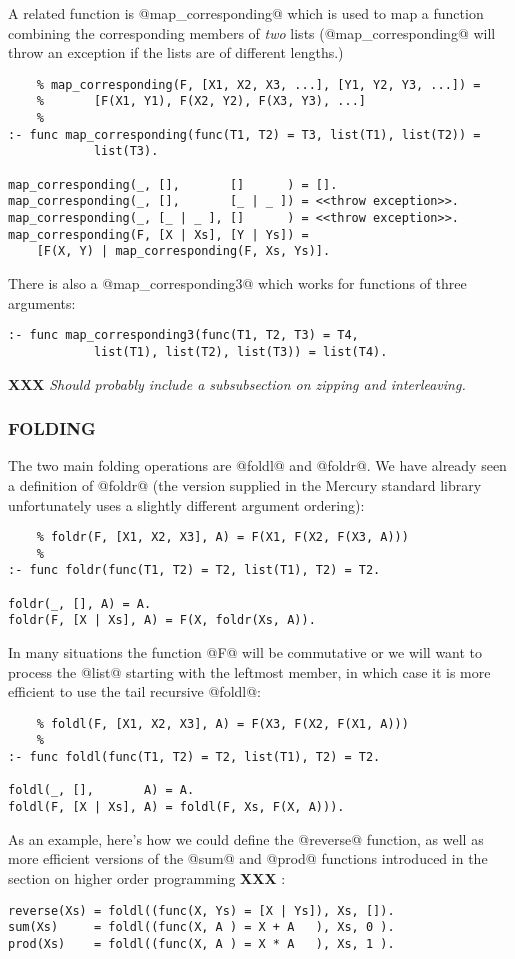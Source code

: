 \documentclass[a4paper,11pt,notitlepage,onecolumn]{article}
\newcommand{\XXX}[1]%
{{\small\textbf{XXX} \emph{#1}}}
\begin{document}
A related function is @map_corresponding@ which is used to map a
function combining the corresponding members of \emph{two} lists
(@map_corresponding@ will throw an exception if the lists are of
different lengths.)
\begin{verbatim}
    % map_corresponding(F, [X1, X2, X3, ...], [Y1, Y2, Y3, ...]) =
    %       [F(X1, Y1), F(X2, Y2), F(X3, Y3), ...]
    %
:- func map_corresponding(func(T1, T2) = T3, list(T1), list(T2)) =
            list(T3).

map_corresponding(_, [],       []      ) = [].
map_corresponding(_, [],       [_ | _ ]) = <<throw exception>>.
map_corresponding(_, [_ | _ ], []      ) = <<throw exception>>.
map_corresponding(F, [X | Xs], [Y | Ys]) =
    [F(X, Y) | map_corresponding(F, Xs, Ys)].
\end{verbatim}

There is also a @map_corresponding3@ which works for functions of three
arguments:
\begin{verbatim}
:- func map_corresponding3(func(T1, T2, T3) = T4,
            list(T1), list(T2), list(T3)) = list(T4).
\end{verbatim}

\XXX{Should probably include a subsubsection on zipping and
interleaving.}

\subsubsection{FOLDING}

The two main folding operations are @foldl@ and @foldr@.  We have
already seen a definition of @foldr@ (the version supplied in the
Mercury standard library unfortunately uses a slightly different
argument ordering):
\begin{verbatim}
    % foldr(F, [X1, X2, X3], A) = F(X1, F(X2, F(X3, A)))
    %
:- func foldr(func(T1, T2) = T2, list(T1), T2) = T2.

foldr(_, [], A) = A.
foldr(F, [X | Xs], A) = F(X, foldr(Xs, A)).
\end{verbatim}
In many situations the function @F@ will be commutative or we will want
to process the @list@ starting with the leftmost member, in which case
it is more efficient to use the tail recursive @foldl@:
\begin{verbatim}
    % foldl(F, [X1, X2, X3], A) = F(X3, F(X2, F(X1, A)))
    %
:- func foldl(func(T1, T2) = T2, list(T1), T2) = T2.

foldl(_, [],       A) = A.
foldl(F, [X | Xs], A) = foldl(F, Xs, F(X, A))).
\end{verbatim}
As an example, here's how we could define the @reverse@ function, as
well as more efficient versions of the @sum@ and @prod@ functions
introduced in the section on higher order programming \XXX{}:
\begin{verbatim}
reverse(Xs) = foldl((func(X, Ys) = [X | Ys]), Xs, []).
sum(Xs)     = foldl((func(X, A ) = X + A   ), Xs, 0 ).
prod(Xs)    = foldl((func(X, A ) = X * A   ), Xs, 1 ).
\end{verbatim}
\end{document}
